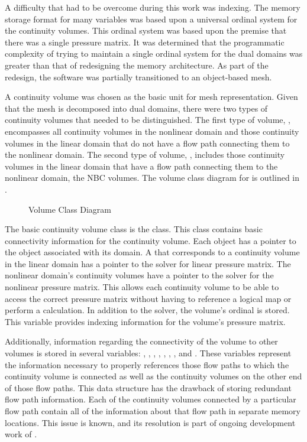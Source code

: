 A difficulty that had to be overcome during this work was indexing.
The memory storage format for many variables was based upon a universal ordinal system for the continuity volumes.
This ordinal system was based upon the premise that there was a single pressure matrix.
It was determined that the programmatic complexity of trying to maintain a single ordinal system for the dual domains was greater than that of redesigning the memory architecture.
As part of the redesign, the software was partially transitioned to an object-based mesh.

A continuity volume was chosen as the basic unit for mesh representation.
Given that the mesh is decomposed into dual domains, there were two types of continuity volumes that needed to be distinguished.
The first type of volume, , encompasses all continuity volumes in the nonlinear domain and those continuity volumes in the linear domain that do not have a flow path connecting them to the nonlinear domain.
The second type of volume, , includes those continuity volumes in the linear domain that have a flow path connecting them to the nonlinear domain, the NBC volumes.
The volume class diagram for \cobra{} is outlined in .

\begin{figure}[ht!]
\singlespace\centering

\caption{Volume Class Diagram}
\label{fig:volumeClassDiagram}
\end{figure}

The basic continuity volume class is the  class.
This class contains basic connectivity information for the continuity volume.
Each  object has a pointer to the  object associated with its domain.
A  that corresponds to a continuity volume in the linear domain has a  pointer to the solver for linear pressure matrix.
The nonlinear domain's continuity volumes have a  pointer to the solver for the nonlinear pressure matrix.
This allows each continuity volume to be able to access the correct pressure matrix without having to reference a logical map or perform a calculation.
In addition to the solver, the volume's ordinal is stored.
This variable provides indexing information for the volume's pressure matrix.

Additionally, information regarding the connectivity of the volume to other volumes is stored in several variables: , , , , , , , and .
These variables represent the information necessary to properly references those flow paths to which the continuity volume is connected as well as the continuity volumes on the other end of those flow paths.
This data structure has the drawback of storing redundant flow path information.
Each of the continuity volumes connected by a particular flow path contain all of the information about that flow path in separate memory locations.
This issue is known, and its resolution is part of ongoing development work of \cobra{}.

